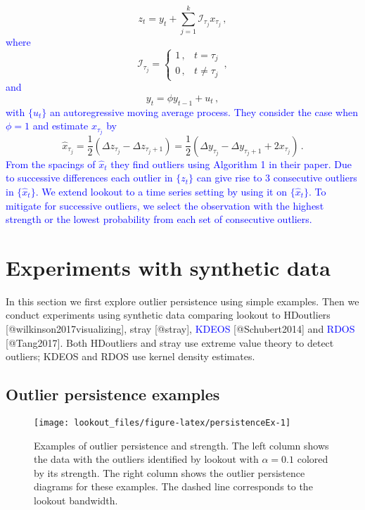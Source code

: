 \documentclass[
]{article}
\begin{document}
\[ z_t = y_t + \sum_{j=1}^k \mathcal{I}_{\tau_j} x_{\tau_j} \, , \]
\textcolor{blue}{where} \[ \mathcal{I}_{\tau_j} =  \begin{cases} 
      1\, , & t = \tau_j \\
      0\, ,  & t \neq \tau_j
   \end{cases} \, ,
\] \textcolor{blue}{and } \[ y_t = \phi y_{t-1} + u_t \, , \]
\textcolor{blue}{with $\{u_t\}$ an autoregressive moving average process. They consider the case when  $\phi = 1$  and estimate $x_{\tau_j}$ by }
\[ \hat{x}_{\tau_j} = \frac{1}{2}\left(\Delta z_{\tau_j} - \Delta z_{\tau_j +1}  \right)  = \frac{1}{2}\left(\Delta y_{\tau_j} - \Delta y_{\tau_j +1}  + 2 x_{\tau_j}\right) \, .\]
\textcolor{blue}{ From the spacings of $\hat{x}_{t}$ they find outliers using  Algorithm 1 in their paper. Due to successive differences each outlier in $\{z_{t}\}$ can give rise to 3 consecutive outliers in $\{\hat{x}_{t}\}$. We extend lookout to a time series setting by using it on $\{\hat{x}_{t}\}$. To mitigate for successive outliers, we select the observation with the highest strength or the lowest probability from each set of consecutive outliers. }

\hypertarget{sec:simulations}{%
\section{Experiments with synthetic data}\label{sec:simulations}}

In this section we first explore outlier persistence using simple
examples. Then we conduct experiments using synthetic data comparing
lookout to HDoutliers {[}@wilkinson2017visualizing{]}, stray
{[}@stray{]}, \textcolor{blue}{KDEOS} {[}@Schubert2014{]} and
\textcolor{blue}{RDOS} {[}@Tang2017{]}. Both HDoutliers and stray use
extreme value theory to detect outliers; KDEOS and RDOS use kernel
density estimates.

\hypertarget{sec:PersistenceExamples}{%
\subsection{Outlier persistence
examples}\label{sec:PersistenceExamples}}

\begin{figure}
\texttt{[image: lookout\_files/figure-latex/persistenceEx-1]} \caption{Examples of outlier persistence and strength. The left column shows the data with the outliers identified by lookout with $\alpha = 0.1$ colored by its strength. The right column shows the outlier persistence diagrams for these examples. The dashed line corresponds to the lookout bandwidth.}\label{fig:persistenceEx}
\end{figure}
\end{document}
